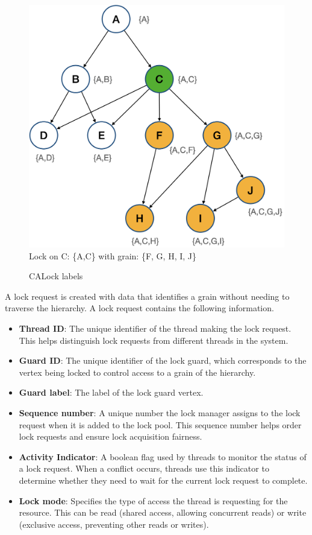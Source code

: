\begin{figure}[h]
	\centering
	\captionsetup{justification=centering}
	\includegraphics[width=.6\columnwidth]{figures/CALockExample_locked.png}\\
	{\small
		Lock on C: \{A,C\} with grain: \{F, G, H, I, J\}
	}
	\caption{CALock labels}
	\label{calockexample}
\end{figure}

A lock request is created with data that identifies a grain without needing to traverse the hierarchy. A lock request contains the following information.

\begin{itemize}
	\item \textbf{Thread ID}: The unique identifier of the thread making the lock request. This helps distinguish lock requests from different threads in the system.
	\item \textbf{Guard ID}: The unique identifier of the lock guard, which corresponds to the vertex being locked to control access to a grain of the hierarchy.
	\item \textbf{Guard label}: The label of the lock guard vertex.
	\item \textbf{Sequence number}: A unique number the lock manager assigns to the lock request when it is added to the lock pool. This sequence number helps order lock requests and ensure lock acquisition fairness.
	\item \textbf{Activity Indicator}: A boolean flag used by threads to monitor the status of a lock request. When a conflict occurs, threads use this indicator to determine whether they need to wait for the current lock request to complete.
	\item \textbf{Lock mode}: Specifies the type of access the thread is requesting for the resource. This can be read (shared access, allowing concurrent reads) or write (exclusive access, preventing other reads or writes).
\end{itemize}

